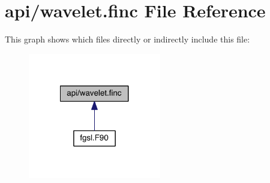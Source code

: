 \hypertarget{wavelet_8finc}{\section{api/wavelet.finc File Reference}
\label{wavelet_8finc}
}
This graph shows which files directly or indirectly include this file\-:
\nopagebreak
\begin{figure}[H]
\begin{center}
\leavevmode
\includegraphics[width=164pt]{wavelet_8finc__dep__incl}
\end{center}
\end{figure}
